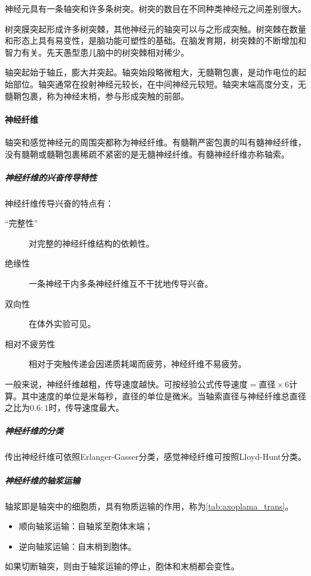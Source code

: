 神经元具有一条轴突和许多条树突。树突的数目在不同种类神经元之间差别很大。

树突膜突起形成许多树突棘，其他神经元的轴突可以与之形成突触。树突棘在数量和形态上具有易变性，是脑功能可塑性的基础。在脑发育期，树突棘的不断增加和智力有关。先天愚型患儿脑中的树突棘相对稀少。

轴突起始于轴丘，膨大并突起。轴突始段略微粗大，无髓鞘包裹，是动作电位的起始部位。轴突通常在投射神经元较长，在中间神经元较短。轴突末端高度分支，无髓鞘包裹，称为神经末梢，参与形成突触的前部。

\paragraph{神经纤维}

轴突和感觉神经元的周围突都称为神经纤维。有髓鞘严密包裹的叫有髓神经纤维，没有髓鞘或髓鞘包裹稀疏不紧密的是无髓神经纤维。有髓神经纤维亦称轴索。

\subparagraph{神经纤维的兴奋传导特性}

神经纤维传导兴奋的特点有：
\begin{description}
	\item[“完整性”] 对完整的神经纤维结构的依赖性。
	\item[绝缘性] 一条神经干内多条神经纤维互不干扰地传导兴奋。
	\item[双向性] 在体外实验可见。
	\item[相对不疲劳性] 相对于突触传递会因递质耗竭而疲劳，神经纤维不易疲劳。
\end{description}

一般来说，神经纤维越粗，传导速度越快。可按经验公式$\text{传导速度}=\text{直径}\times 6$计算。其中速度的单位是米每秒，直径的单位是微米。当轴索直径与神经纤维总直径之比为$0.6:1$时，传导速度最大。

\subparagraph{神经纤维的分类}

传出神经纤维可依照Erlanger-Gasser分类，感觉神经纤维可按照Lloyd-Hunt分类。

\subparagraph{神经纤维的轴浆运输}

轴浆即是轴突中的细胞质，具有物质运输的作用，称为\autoref{tab:axoplama_trans}。
\begin{itemize}
	\item 顺向轴浆运输：自轴浆至胞体末端；
	\item 逆向轴浆运输：自末梢到胞体。
\end{itemize}

如果切断轴突，则由于轴浆运输的停止，胞体和末梢都会变性。

